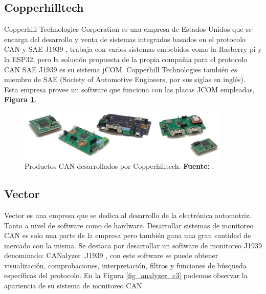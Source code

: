 \subsection{Copperhilltech}
Copperhill Technologies Corporation es una empresa de Estados Unidos que se encarga del desarrollo y venta de sistemas integrados basados en el protocolo CAN y SAE J1939 \cite{cite_copper_c3}, trabaja con varios sistemas embebidos como la Rasberry pi y la ESP32,  pero la solución propuesta de la propia compañia  para el protocolo CAN SAE J1939 es su sistema jCOM.   Copperhill Technologies también es miembro de SAE (Society of Automotive Engineers, por sus siglas en inglés). Esta empresa provee un software que funciona con las placas JCOM empleadas, \textbf{Figura \ref{fig_copper_c3}}. 


\begin{figure}[H]
	\centering
	\includegraphics[width=0.9\textwidth]{./Cap3imagen/copperhill.jpg}
	\caption[Productos CAN desarrollados por Copperhilltech .]{Productos CAN desarrollados por Copperhilltech.\textbf{ Fuente:} \cite{cite_copper_c3}.}
	\label{fig_copper_c3} %
\end{figure}

\subsection{Vector}
Vector es una empresa que se dedica al  desarrollo de la electrónica automotriz.  
Tanto a nivel de software como de hardware. Desarrollar sistemas de monitoreo CAN es solo una parte de la empresa pero también gana una gran cantidad de mercado con la misma. 
Se destaca por desarrollar un software de monitoreo J1939 denominado: CANalyzer .J1939 \cite{cite_analyzer_c3}, con este software se puede obtener visualización, comprobaciones, interpretación, filtros y funciones de búsqueda específicas del protocolo. 
En la Figura \ref{fig_analyzer_c3} podemos observar la apariencia de su sistema de monitoreo CAN. 


